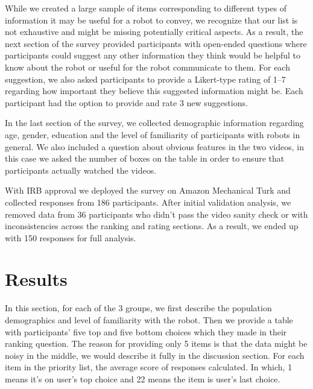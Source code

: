 \documentclass[letterpaper, 10 pt, conference]{ieeeconf}  %
\begin{document}
    While we created a large sample of items corresponding to different types of information it may be useful for a robot to convey, we recognize that our list is not exhaustive and might be missing potentially critical aspects. As a result, the next section of the survey provided participants with open-ended questions where participants could suggest any other information they think would be helpful to know about the robot or useful for the robot communicate to them. For each suggestion, we also asked participants to provide a Likert-type rating of 1--7 regarding how important they believe this suggested information might be. Each participant had the option to provide and rate 3 new suggestions. %

    In the last section of the survey, we collected demographic information regarding age, gender, education and the level of familiarity of participants with robots in general. We also included a question about obvious features in the two videos, in this case we asked the number of boxes on the table in order to ensure that participants actually watched the videos.

    With IRB approval we deployed the survey on Amazon Mechanical Turk and collected responses from 186 participants. After initial validation analysis, we removed data from 36 participants who didn't pass the video sanity check or  with inconsistencies across the ranking and rating sections. %
    As a result, we ended up with 150 responses for full analysis.

\section{Results}
In this section, for each of the 3 groups, we first describe the population demographics and level of familiarity with the robot. Then we provide a table with participants' five top and five bottom choices which they made in their ranking question. The reason for providing only 5 items is that the data might be noisy in the middle, we would describe it fully in the discussion section. For each item in the priority list, the average score of responses calculated. In which, 1 means it's on user's top choice and 22 means the item is user's last choice.
\end{document}
